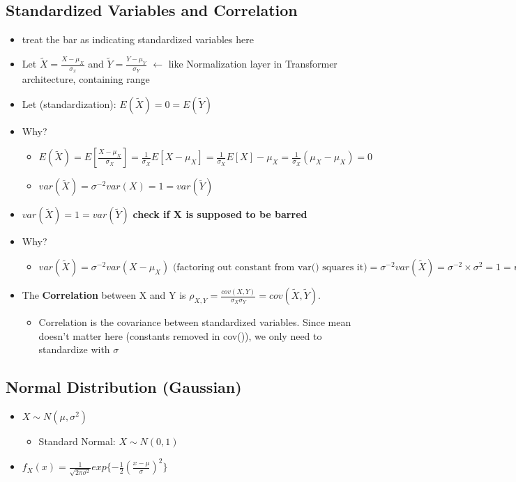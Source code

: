 \documentclass[10pt, oneside]{article}
\begin{document}
\subsection{Standardized Variables and Correlation}
\begin{itemize}
    \item treat the bar as indicating standardized variables here
    \item Let $\tilde{X} = \frac{X-\mu_X}{\sigma_x}$ and $\tilde{Y}
    =\frac{Y-\mu_Y}{\sigma_Y}$ $\leftarrow$ like Normalization layer in Transformer architecture, containing range
    \item Let (standardization): $E(\tilde{X})=0=E(\tilde{Y})$
    \item Why?
    \begin{itemize}
        \item $E(\tilde X) = E[\frac{X-\mu_X}{\sigma_X}]=\frac{1}{\sigma_X}E[X-\mu_X]=\frac{1}{\sigma_X} E[X] -\mu_X=\frac{1}{\sigma_X}(\mu_X-\mu_X)=0$
        \item $var(\tilde X) = \sigma ^{-2} var(X)=1=var(\tilde Y)$
    \end{itemize}
    \item $var(\tilde X) = 1= var(\tilde Y)$ \textbf{check if X is supposed to be barred}
    \item Why?
    \begin{itemize}
        \item $var(\tilde X)=\sigma^{-2} var(X-\mu_X) \text{ (factoring out constant from var() squares it)}=\sigma^{-2} var(\tilde X)= \sigma^{-2} \times \sigma^2 = 1 = var(\tilde Y)$
    \end{itemize}
    \item The \textbf{Correlation} between X and Y is $\rho_{X,Y}=\frac{cov(X,Y)}{\sigma_X \sigma_Y} = cov(\tilde X, \tilde Y)$. 
    \begin{itemize}
        \item Correlation is the covariance between standardized variables. Since mean doesn't matter here (constants removed in cov()), we only need to standardize with $\sigma$
    \end{itemize}
\end{itemize}
\subsection{Normal Distribution (Gaussian)}
\begin{itemize}
    \item $X \sim N(\mu,\sigma ^2)$
    \begin{itemize}
        \item Standard Normal: $X\sim N(0,1)$
    \end{itemize}
    \item $f_X(x)=\frac{1}{\sqrt{2\pi\sigma^2}}exp\{-\frac{1}{2}(\frac{x-\mu}{\sigma})^2\}$
\end{itemize}
\end{document}
